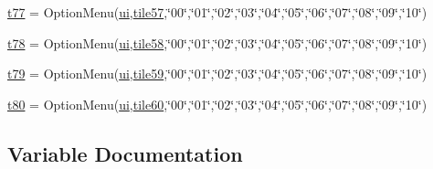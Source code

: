 \begin{DoxyCompactItemize}
\item 
\mbox{\hyperlink{namespacegui_a7dbb7da7abe6b97bf52c722f728e1ab5}{t77}} = Option\+Menu(\mbox{\hyperlink{namespacegui_a40ab7281456eadbea2dc2038f5c24fa1}{ui}},\mbox{\hyperlink{namespacegui_aa3077c3a423a682ff87cf7a59a096a1a}{tile57}},\char`\"{}00\char`\"{},\char`\"{}01\char`\"{},\char`\"{}02\char`\"{},\char`\"{}03\char`\"{},\char`\"{}04\char`\"{},\char`\"{}05\char`\"{},\char`\"{}06\char`\"{},\char`\"{}07\char`\"{},\char`\"{}08\char`\"{},\char`\"{}09\char`\"{},\char`\"{}10\char`\"{})
\item 
\mbox{\hyperlink{namespacegui_a8e05d3dfa6cee82c82d4eec30d56f773}{t78}} = Option\+Menu(\mbox{\hyperlink{namespacegui_a40ab7281456eadbea2dc2038f5c24fa1}{ui}},\mbox{\hyperlink{namespacegui_a99c90d661722beb1c379e2d9fc6169a4}{tile58}},\char`\"{}00\char`\"{},\char`\"{}01\char`\"{},\char`\"{}02\char`\"{},\char`\"{}03\char`\"{},\char`\"{}04\char`\"{},\char`\"{}05\char`\"{},\char`\"{}06\char`\"{},\char`\"{}07\char`\"{},\char`\"{}08\char`\"{},\char`\"{}09\char`\"{},\char`\"{}10\char`\"{})
\item 
\mbox{\hyperlink{namespacegui_a4f1d22993ba837606a10c17e13be7f78}{t79}} = Option\+Menu(\mbox{\hyperlink{namespacegui_a40ab7281456eadbea2dc2038f5c24fa1}{ui}},\mbox{\hyperlink{namespacegui_a841a445f892ff85a173e8562fe380797}{tile59}},\char`\"{}00\char`\"{},\char`\"{}01\char`\"{},\char`\"{}02\char`\"{},\char`\"{}03\char`\"{},\char`\"{}04\char`\"{},\char`\"{}05\char`\"{},\char`\"{}06\char`\"{},\char`\"{}07\char`\"{},\char`\"{}08\char`\"{},\char`\"{}09\char`\"{},\char`\"{}10\char`\"{})
\item 
\mbox{\hyperlink{namespacegui_af0f90832c31c273f023dac997bfee922}{t80}} = Option\+Menu(\mbox{\hyperlink{namespacegui_a40ab7281456eadbea2dc2038f5c24fa1}{ui}},\mbox{\hyperlink{namespacegui_ab03da7520cb8fba94a7355a29961a27c}{tile60}},\char`\"{}00\char`\"{},\char`\"{}01\char`\"{},\char`\"{}02\char`\"{},\char`\"{}03\char`\"{},\char`\"{}04\char`\"{},\char`\"{}05\char`\"{},\char`\"{}06\char`\"{},\char`\"{}07\char`\"{},\char`\"{}08\char`\"{},\char`\"{}09\char`\"{},\char`\"{}10\char`\"{})
\end{DoxyCompactItemize}


\subsection{Variable Documentation}
\mbox{\label{namespacegui_a779aeda230f988f7df07814a8e4084b8}} 
